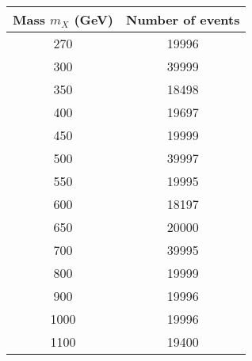 \begin{tabular}{c | c}
Mass $m_X$ (GeV) & Number of events \\ \hline
270 & 19996\\
300 & 39999\\
350 & 18498\\
400 & 19697\\
450 & 19999\\
500 & 39997\\
550 & 19995\\
600 & 18197\\
650 & 20000\\
700 & 39995\\
800 & 19999\\
900 & 19996\\
1000& 19996\\
1100& 19400\\
\end{tabular}
